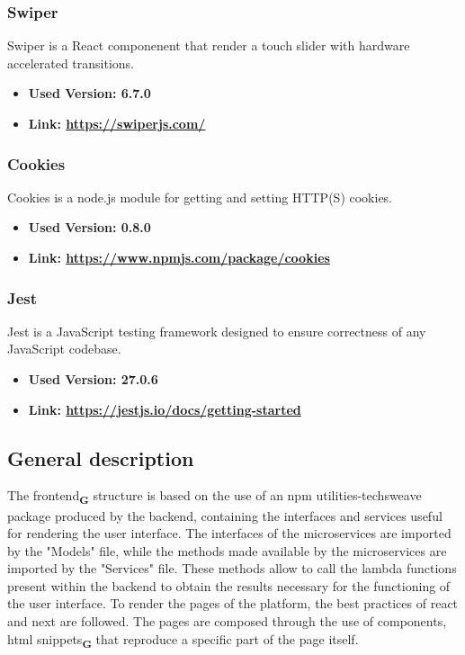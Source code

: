 \subsubsection{Swiper}
Swiper is a React componenent that render a touch slider with hardware accelerated transitions.
\begin{itemize}
  \item \textbf{Used Version: 6.7.0}
  \item \textbf{Link: \url{https://swiperjs.com/}}
\end{itemize}
\subsubsection{Cookies}
Cookies is a node.js module for getting and setting HTTP(S) cookies.
\begin{itemize}
  \item \textbf{Used Version: 0.8.0}
  \item \textbf{Link: \url{https://www.npmjs.com/package/cookies}}
\end{itemize}
\subsubsection{Jest}
Jest is a JavaScript testing framework designed to ensure correctness of any JavaScript codebase.
\begin{itemize}
  \item \textbf{Used Version: 27.0.6}
  \item \textbf{Link: \url{https://jestjs.io/docs/getting-started}}
\end{itemize}
\subsection{General description}
The frontend\textsubscript{\textbf{G}} structure is based on the use of an npm utilities-techsweave package produced by the backend, containing the interfaces and services useful for rendering the user interface. The interfaces of the microservices are imported by the "Models" file, while the methods made available by the microservices are imported by the "Services" file. These methods allow to call the lambda functions present within the backend to obtain the results necessary for the functioning of the user interface. To render the pages of the platform, the best practices of react and next are followed. The pages are composed through the use of components, html snippets\textsubscript{\textbf{G}} that reproduce a specific part of the page itself.
